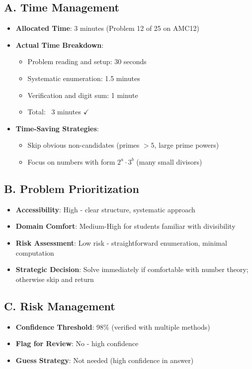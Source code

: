 \documentclass[]{article}
\begin{document}
\begin{competitionbox}
\subsection*{A. Time Management}
\begin{itemize}[leftmargin=*]
    \item \textbf{Allocated Time}: 3 minutes (Problem 12 of 25 on AMC12)
    \item \textbf{Actual Time Breakdown}:
    \begin{itemize}
        \item Problem reading and setup: 30 seconds
        \item Systematic enumeration: 1.5 minutes
        \item Verification and digit sum: 1 minute
        \item Total: ~3 minutes $\checkmark$
    \end{itemize}
    \item \textbf{Time-Saving Strategies}:
    \begin{itemize}
        \item Skip obvious non-candidates (primes $> 5$, large prime powers)
        \item Focus on numbers with form $2^a \cdot 3^b$ (many small divisors)
    \end{itemize}
\end{itemize}

\subsection*{B. Problem Prioritization}
\begin{itemize}[leftmargin=*]
    \item \textbf{Accessibility}: High - clear structure, systematic approach
    \item \textbf{Domain Comfort}: Medium-High for students familiar with divisibility
    \item \textbf{Risk Assessment}: Low risk - straightforward enumeration, minimal computation
    \item \textbf{Strategic Decision}: Solve immediately if comfortable with number theory; otherwise skip and return
\end{itemize}

\subsection*{C. Risk Management}
\begin{itemize}[leftmargin=*]
    \item \textbf{Confidence Threshold}: 98\% (verified with multiple methods)
    \item \textbf{Flag for Review}: No - high confidence
    \item \textbf{Guess Strategy}: Not needed (high confidence in answer)
\end{itemize}


\end{competitionbox}
\end{document}
